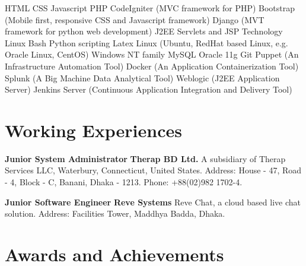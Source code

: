 \documentclass[11pt,a4paper,sans]{moderncv}
\begin{document}
{
HTML
\newline CSS
\newline Javascript
\newline PHP
\newline CodeIgniter (MVC framework for PHP)
\newline Bootstrap (Mobile first, responsive CSS and Javascript framework)
\newline Django (MVT framework for python web development)
\newline J2EE Servlets and JSP Technology
}
{
Linux Bash
\newline Python scripting
\newline Latex
}
{
Linux (Ubuntu, RedHat based Linux, e.g. Oracle Linux, CentOS)
\newline Windows NT family
}
{
MySQL
\newline Oracle 11g
}
{
Git
}
{
Puppet (An Infrastructure Automation Tool)
\newline Docker (An Application Containerization Tool)
\newline Splunk (A Big Machine Data Analytical Tool)
\newline Weblogic (J2EE Application Server)
\newline Jenkins Server (Continuous Application Integration and Delivery Tool)
}


\section{Working Experiences}
{
\textbf{Junior System Administrator\newline}
\textbf{Therap BD Ltd.\newline}
A subsidiary of Therap Services LLC, Waterbury, Connecticut, United States.\newline
Address: House - 47, Road - 4, Block - C, Banani, Dhaka - 1213. \newline
Phone: +88(02)982 1702-4.
}

{
\textbf{Junior Software Engineer\newline}
\textbf{Reve Systems\newline}
Reve Chat, a cloud based live chat solution.
\newline
Address: Facilities Tower, Maddhya Badda, Dhaka.
}


\section{Awards and Achievements}
\end{document}
